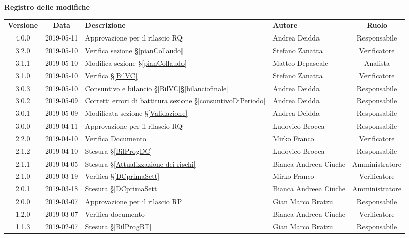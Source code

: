 	\begin{center}
		\textbf{Registro delle modifiche}
	\end{center}
	\begin{center}
		\begin{tabularx}{\textwidth}{|c|c|X|X|c|}
			\hline
			\textbf{Versione} & \textbf{Data} & \textbf{Descrizione} & \textbf{Autore} & \textbf{Ruolo} \\
			4.0.0 & 2019-05-11 & Approvazione per il rilascio RQ & Andrea Deidda & Responsabile \\
			\hline 3.2.0&2019-05-10& Verifica sezione \S\ref{pianCollaudo}&Stefano Zanatta& Verificatore\\
			\hline 3.1.1&2019-05-10&Modifica sezione \S\ref{pianCollaudo}&Matteo Depascale& Analista\\
			\hline
			3.1.0 & 2019-05-10 & Verifica \S\ref{BilVC} & Stefano Zanatta & Verificatore \\
			\hline
			3.0.3 & 2019-05-10 & Consuntivo e bilancio \S\ref{BilVC}\S\ref{bilanciofinale} & Andrea Deidda & Responsabile \\
			\hline
			3.0.2 & 2019-05-09 & Corretti errori di battitura sezione \S\ref{consuntivoDiPeriodo} & Andrea Deidda & Responsabile \\
			\hline
			3.0.1 & 2019-05-09 & Modificata sezione \S\ref{Validazione} & Andrea Deidda & Responsabile \\
			\hline
			3.0.0 &2019-04-11&Approvazione per il rilascio RQ & Ludovico Brocca & Responsabile\\
			\hline
			2.2.0 &2019-04-10&Verifica Documento& Mirko Franco & Verificatore\\
			\hline
			2.1.2 &2019-04-10&Stesura \S\ref{BilProgDC}& Ludovico Brocca & Responsabile\\
			\hline
			2.1.1 & 2019-04-05 & Stesura  \S\ref{Attualizzazione dei rischi} & Bianca Andreea Ciuche & Amministratore \\		
			\hline
			2.1.0 &2019-03-19&Verifica  \S\ref{DCprimaSett}& Mirko Franco & Verificatore\\
			\hline
			2.0.1 & 2019-03-18 & Stesura  \S\ref{DCprimaSett} & Bianca Andreea Ciuche & Amministratore \\
			\hline
			2.0.0 & 2019-03-07 & Approvazione per il rilascio RP & Gian Marco Bratzu & Responsabile \\
			\hline
			1.2.0 & 2019-03-07 & Verifica documento & Bianca Andreea Ciuche & Verificatore \\
			\hline
			1.1.3 & 2019-02-07 & Stesura \S\ref{BilProgBT} & Gian Marco Bratzu & Responsabile \\

\end{tabularx}
\end{center}
